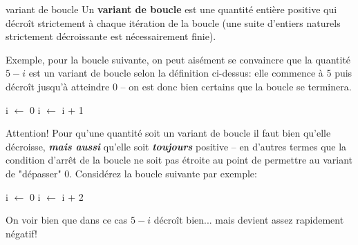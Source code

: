 \documentclass[12pt]{article}
\begin{document}
	\begin{MaDef}{variant de boucle}
		Un \textbf{variant de boucle} est une quantité entière positive qui décroît strictement à chaque itération de la boucle (une suite d’entiers naturels strictement décroissante est nécessairement finie).
		\vspace{\baselineskip}
		
		Exemple, pour la boucle suivante, on peut aisément se convaincre que la quantité $5 - i$ est un variant de boucle selon la définition ci-dessus: elle commence à 5 puis décroît jusqu'à atteindre 0 -- on est donc bien certains que la boucle se terminera.
		
		\begin{algorithmic}[1]
			\State i $\leftarrow$ 0
			\State i $\leftarrow$ i + 1
			\EndWhile
		\end{algorithmic}
	\end{MaDef}
	
		Attention! Pour qu'une quantité soit un variant de boucle il faut bien qu'elle décroisse, \textbf{\textit{mais aussi}} qu'elle soit \textbf{\textit{toujours}} positive -- en d'autres termes que la condition d'arrêt de la boucle ne soit pas étroite au point de permettre au variant de "dépasser" 0. Considérez la boucle suivante par exemple:
	\begin{algorithmic}[1]
		\State i $\leftarrow$ 0
		\State{}
		\State i $\leftarrow$ i + 2
		\EndWhile
	\end{algorithmic}
	
	On voir bien que dans ce cas $5-i$ décroît bien... mais devient assez rapidement négatif!
	
\end{document}
